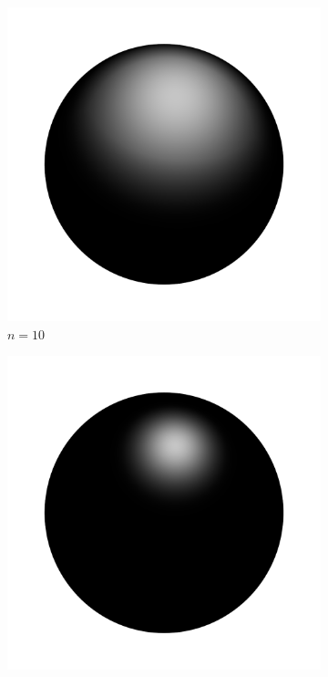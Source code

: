 \begin{figure}[H]
	\centering
	\begin{subfigure}[t]{0.25\textwidth}
		\centering
		\captionsetup{justification=centering}
		\includegraphics[width=\linewidth]{media/blinn_10.png}
		\caption*{$n = 10$}
	\end{subfigure}%
	\begin{subfigure}[t]{0.25\textwidth}
		\centering
		\captionsetup{justification=centering}
		\includegraphics[width=\linewidth]{media/blinn_50.png}

\end{subfigure}
\end{figure}
